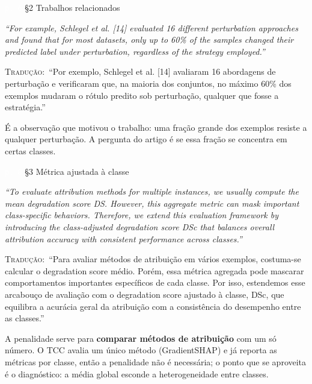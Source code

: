 \documentclass[11pt,a4paper]{article}
\newcommand{\pagechip}[1]{{\setlength{\fboxsep}{1.5pt}\colorbox{cAcc}{\textcolor{white}{\scriptsize\texttt{#1}}}}}
\newenvironment{origquote}{\par\itshape\small}{\par}
\newenvironment{tradquote}{\par\small\textsc{Tradução:}\ }{\par}
\newcommand{\explab}[1]{\par\smallskip{\small\color{cAcc}\textbf{\MakeUppercase{#1}}}\par}
\begin{document}
\begin{citacard}{\pagechip{p. 6} §2 Trabalhos relacionados}
\begin{origquote}“For example, Schlegel et al. [14] evaluated 16 different perturbation approaches and found that for most datasets, only up to 60\% of the samples changed their predicted label under perturbation, regardless of the strategy employed.”\end{origquote}
\begin{tradquote}“Por exemplo, Schlegel et al. [14] avaliaram 16 abordagens de perturbação e verificaram que, na maioria dos conjuntos, no máximo 60\% dos exemplos mudaram o rótulo predito sob perturbação, qualquer que fosse a estratégia.”\end{tradquote}
\explab{Explicação}
É a observação que motivou o trabalho: uma fração grande dos exemplos resiste a qualquer perturbação. A pergunta do artigo é se essa fração se concentra em certas classes.
\end{citacard}

\begin{citacard}{\pagechip{p. 8} §3 Métrica ajustada à classe}
\begin{origquote}“To evaluate attribution methods for multiple instances, we usually compute the mean degradation score DS. However, this aggregate metric can mask important class-specific behaviors. Therefore, we extend this evaluation framework by introducing the class-adjusted degradation score DSc that balances overall attribution accuracy with consistent performance across classes.”\end{origquote}
\begin{tradquote}“Para avaliar métodos de atribuição em vários exemplos, costuma-se calcular o degradation score médio. Porém, essa métrica agregada pode mascarar comportamentos importantes específicos de cada classe. Por isso, estendemos esse arcabouço de avaliação com o degradation score ajustado à classe, DSc, que equilibra a acurácia geral da atribuição com a consistência do desempenho entre as classes.”\end{tradquote}
\explab{Explicação}
A penalidade serve para \textbf{comparar métodos de atribuição} com um só número. O TCC avalia um único método (GradientSHAP) e já reporta as métricas por classe, então a penalidade não é necessária; o ponto que se aproveita é o diagnóstico: a média global esconde a heterogeneidade entre classes.
\end{citacard}
\end{document}
